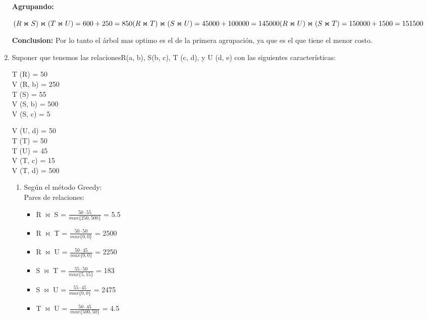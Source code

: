 \documentclass{templateNote}
\begin{document}
\begin{enumerate}
    \textbf{Agrupando:}

    \begin{math}
        (R \Join S) \Join (T \Join U) = 600 + 250 = 850 \\
        (R \Join T) \Join (S \Join U) = 45000 + 100000 = 145000 \\
        (R \Join U) \Join (S \Join T) = 150000 + 1500 = 151500 \\
    \end{math}

    \textbf{Conclusion:}
    Por lo tanto el árbol mas optimo es el de la primera agrupación, ya que es el que tiene el menor costo.
    

    \newpage
    \item Suponer que tenemos las relacionesR(a, b), S(b, c), T (c, d), y U (d, e) con las siguientes características:
    
    \begin{minipage}{0.5\textwidth}
        T (R) = 50 \\
        V (R, b) = 250 \\
        T (S) = 55 \\
        V (S, b) = 500 \\
        V (S, c) = 5 
        \end{minipage}%
        \begin{minipage}{0.5\textwidth}
        V (U, d) = 50 \\
        T (T) = 50 \\
        T (U) = 45 \\
        V (T, c) = 15 \\
        V (T, d) = 500
    \end{minipage}

    \begin{enumerate}
        \item Según el método Greedy:
        \\Pares de relaciones:
        \begin{itemize}
            \item R $\Join$ S = $\frac{50\cdot55}{max\{250,500\}}$ = 5.5
            \item R $\Join$ T = $\frac{50\cdot50}{max\{0,0\}}$ = 2500
            \item R $\Join$ U = $\frac{50\cdot45}{max\{0,0\}}$ = 2250
            \item S $\Join$ T = $\frac{55\cdot50}{max\{5,15\}}$ = 183
            \item S $\Join$ U = $\frac{55\cdot45}{max\{0,0\}}$ = 2475
            \item T $\Join$ U = $\frac{50\cdot45}{max\{500,50\}}$ = 4.5
        \end{itemize}
    \end{enumerate}


\end{enumerate}
\end{document}
